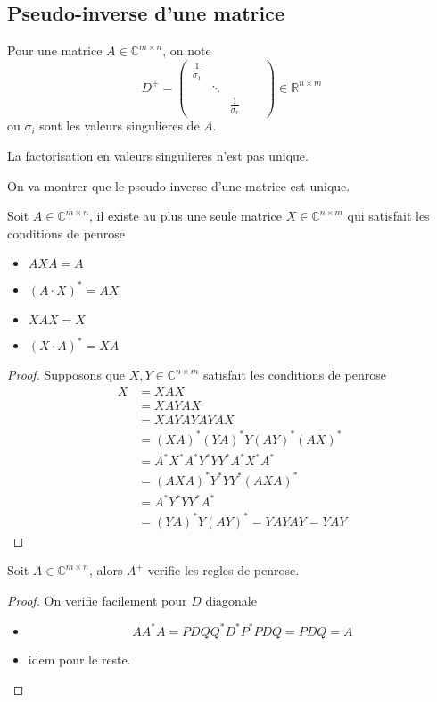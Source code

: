 \documentclass[../main.tex]{subfiles}
\begin{document}
\subsection{Pseudo-inverse d'une matrice}
\begin{defn}
	Pour une matrice $A\in \mathbb{C}^{m \times n}$, on note
	\[ 
	D^{+} =
	\begin{pmatrix}
		\frac{1}{\sigma_1} & & &\\
				   & \ddots & & &\\
				   & & \frac{1}{\sigma_r} & &
	\end{pmatrix} 
	\in \mathbb{R}^{n\times m}
	\]
	ou  $\sigma_i$ sont les valeurs singulieres de $A$.
\end{defn}
\begin{rmq}
La factorisation en valeurs singulieres n'est pas unique.
\end{rmq}
On va montrer que le pseudo-inverse d'une matrice est unique.\\
\begin{thm}
Soit $A \in \mathbb{C}^{m\times n}$, il existe au plus une seule matrice $X \in \mathbb{C}^{n\times m}$ qui satisfait les conditions de penrose
\begin{itemize}
\item $A X A = A$ 
\item $( A \cdot X) ^{*}= A X $ 
\item $XAX=X$ 
\item $( X \cdot A) ^{*}= XA$
\end{itemize}

\end{thm}
\begin{proof}
Supposons que $X,Y \in \mathbb{C}^{n\times m}$ satisfait les conditions de penrose
\begin{align*}
X &= XAX\\
&= XAYAX\\
&=XAYAYAYAX\\
&= ( XA) ^{*}( YA) ^{*} Y (AY ) ^{*}( AX) ^{*}\\
&= A^{*}X^{*}A^{*} Y^{*}Y Y^{*}A^{*}X^{*}A^{*}\\
&= ( AXA) ^{*}Y^{*} Y Y^{*} ( AXA) ^{*}\\
&= A^{*}Y^{*}Y Y^{*} A^{*}\\
&= ( YA) ^{*}Y ( AY) ^{*}= YAYAY = YAY
\end{align*}

\end{proof}
\begin{thm}
Soit $A \in \mathbb{C}^{m\times n}$, alors $A^{+}$ verifie les regles de penrose.
\end{thm}
\begin{proof}
On verifie facilement pour $D$ diagonale
\begin{itemize}
\item 
	\[ 
	A A^{*}A = PDQQ^{*} D^{*}P^{*}P DQ = PDQ =A
	\]

\item idem pour le reste.
	
\end{itemize}

\end{proof}
\end{document}
